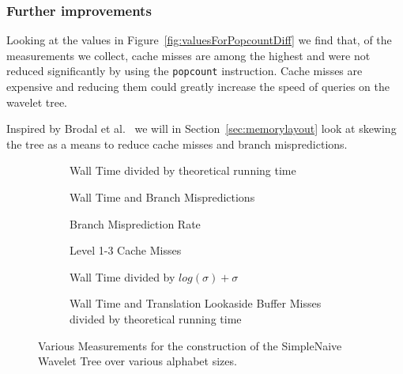 \subsubsection{Further improvements}
Looking at the values in Figure~\ref{fig:valuesForPopcountDiff} we find that, of the measurements we collect, cache misses are among the highest and were not reduced significantly by using the \texttt{popcount} instruction.
Cache misses are expensive and reducing them could greatly increase the speed of queries on the wavelet tree.

Inspired by Brodal et al.~ we will in Section~\ref{sec:memorylayout} look at skewing the tree as a means to reduce cache misses and branch mispredictions.



\begin{figure}\tiny
	\begin{subfigure}{0.48\textwidth}
		
		\caption{Wall Time divided by theoretical running time}
		\label{fig:naiveIntegerAlphabetSize_WallTime}
	\end{subfigure}
	\hfill
	\begin{subfigure}{0.48\textwidth}
		
		\caption{Wall Time and Branch Mispredictions}
		\label{fig:naiveIntegerAlphabetSize_WallTime_BM}
	\end{subfigure}	
	
	\begin{subfigure}{0.48\textwidth}
		
		\caption{Branch Misprediction Rate}
		\label{fig:naiveIntegerAlphabetSize_BMRate}
	\end{subfigure}
	\hfill
	\begin{subfigure}{0.48\textwidth}
		
		\caption{Level 1-3 Cache Misses}
		\label{fig:naiveIntegerAlphabetSize_CM}
	\end{subfigure}
	
	\begin{subfigure}{0.48\textwidth}
		
		\caption{Wall Time divided by $log(\sigma) + \sigma$}
		\label{fig:naiveIntegerAlphabetSize_WallTime_plusSigma}
	\end{subfigure}
	\hfill
	\begin{subfigure}{0.48\textwidth}
		
		\caption{Wall Time and Translation Lookaside Buffer Misses divided by theoretical running time}
		\label{fig:naiveIntegerAlphabetSize_WallTime_TLB}
	\end{subfigure}
	\caption{Various Measurements for the construction of the SimpleNaive Wavelet Tree over various alphabet sizes.}
	\label{fig:naiveIntegerAlphabetSize}
\end{figure}
\restoregeometry
\clearpage

